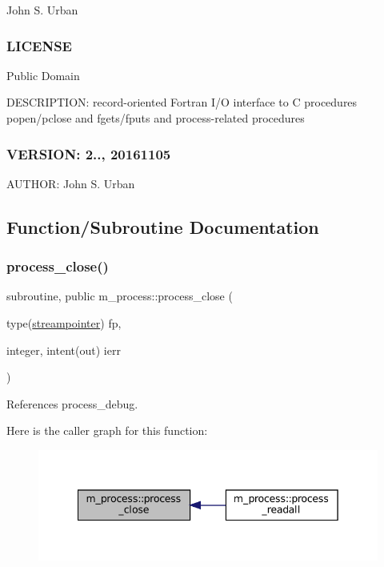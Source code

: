 John S. Urban \subsubsection*{L\+I\+C\+E\+N\+SE}

Public Domain

D\+E\+S\+C\+R\+I\+P\+T\+I\+ON\+: record-\/oriented Fortran I/O interface to C procedures popen/pclose and fgets/fputs and process-\/related procedures \subsubsection*{V\+E\+R\+S\+I\+ON\+: 2.., 20161105}

A\+U\+T\+H\+OR\+: John S. Urban 

\subsection{Function/\+Subroutine Documentation}
\mbox{\label{namespacem__process_ab4c5cad3fb46686f0c9b71c3a634f6ae}} 
\subsubsection{\texorpdfstring{process\+\_\+close()}{process\_close()}}
{\footnotesize\ttfamily subroutine, public m\+\_\+process\+::process\+\_\+close (\begin{DoxyParamCaption}\item[{type(\mbox{\hyperlink{structm__process_1_1streampointer}{streampointer}})}]{fp,  }\item[{integer, intent(out)}]{ierr }\end{DoxyParamCaption})}



References process\+\_\+debug.

Here is the caller graph for this function\+:
\nopagebreak
\begin{figure}[H]
\begin{center}
\leavevmode
\includegraphics[width=342pt]{namespacem__process_ab4c5cad3fb46686f0c9b71c3a634f6ae_icgraph}
\end{center}
\end{figure}
\mbox{\label{namespacem__process_a3c0f543a9ceff2671041d73660f60a59}} 
